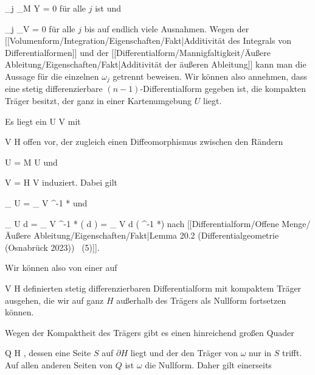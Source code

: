 {{\mavergleichskette
{\vergleichskette
{ \omega_j \vert_{M \setminus Y}
}
{ = }{ 0
}
{  }{
}
{    }{
}
{   }{
}
}
{}{}{}
für alle $j$ ist und

\mavergleichskettedisp
{\vergleichskette
{ \omega_j \vert_V
}
{ =} { 0
}
{ } {
}
{ } {
}
{ } {
}
}
{}{}{}
für alle $j$ bis auf endlich viele Ausnahmen. Wegen der
[[Volumenform/Integration/Eigenschaften/Fakt|Additivität des Integrals von Differentialformen]]
und der
[[Differentialform/Mannigfaltigkeit/Äußere Ableitung/Eigenschaften/Fakt|Additivität der äußeren Ableitung]]
kann man die Aussage für die einzelnen $\omega_j$ getrennt beweisen. Wir können also annehmen, dass eine stetig differenzierbare $(n-1)$-Differentialform gegeben ist, die kompakten Träger besitzt, der ganz in einer Kartenumgebung $U$ liegt.}
{}
\teilbeweis {}{}{}
{Es liegt ein
\maabb {\alpha} { U } { V
} {}
mit

\mavergleichskette
{\vergleichskette
{ V
}
{ \subseteq }{ H
}
{  }{
}
{    }{
}
{   }{
}
}
{}{}{}
offen vor, der zugleich einen Diffeomorphismus zwischen den Rändern

\mavergleichskette
{\vergleichskette
{ \partial U
}
{ = }{ \partial M \cap U
}
{  }{
}
{    }{
}
{   }{
}
}
{}{}{}
und

\mavergleichskette
{\vergleichskette
{ \partial V
}
{ = }{ \partial H \cap V
}
{  }{
}
{    }{
}
{   }{
}
}
{}{}{}
induziert. Dabei gilt

\mavergleichskettedisp
{\vergleichskette
{
\int_{  \partial U  }   \omega
}
{ =} {
\int_{  \partial V  }  \alpha^{-1 *}\omega
}
{ } {
}
{ } {
}
{ } {
}
}
{}{}{}
und

\mavergleichskettedisp
{\vergleichskette
{
\int_{ U  }  d \omega
}
{ =} {
\int_{ V  }  \alpha^{-1 *} (  d \omega)
}
{ =} {
\int_{  V  }  d \left(  \alpha^{-1 *}\omega  \right)
}
{ } {
}
{ } {
}
}
{}{}{}
nach
[[Differentialform/Offene Menge/Äußere Ableitung/Eigenschaften/Fakt|Lemma 20.2 (Differentialgeometrie (Osnabrück 2023))  (5)]].}
{\leerzeichen{}Wir können also von einer auf

\mavergleichskette
{\vergleichskette
{ V
}
{ \subseteq }{ H
}
{  }{
}
{    }{
}
{   }{
}
}
{}{}{}
definierten stetig differenzierbaren Differentialform mit kompaktem Träger ausgehen, die wir auf ganz $H$ außerhalb des Trägers als Nullform fortsetzen können.}
\teilbeweis {}{}{}
{Wegen der Kompaktheit des Trägers gibt es einen hinreichend großen Quader

\mavergleichskette
{\vergleichskette
{ Q
}
{ \subseteq }{ H
}
{  }{
}
{    }{
}
{   }{
}
}
{}{}{,}
dessen eine Seite $S$ auf $\partial H$ liegt und der den Träger von $\omega$ nur in $S$ trifft. Auf allen anderen Seiten von $Q$ ist $\omega$
 {} {}
die Nullform. Daher gilt einerseits

}}
